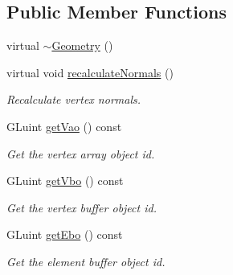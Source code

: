 \subsection*{Public Member Functions}
\begin{DoxyCompactItemize}
\item 
virtual \mbox{\hyperlink{classec_1_1_geometry_a964c581313da2be51a3c78d3be7f48b3}{$\sim$\+Geometry}} ()
\item 
virtual void \mbox{\hyperlink{classec_1_1_geometry_a228d4a0fa01a17379f24aee2c769b501}{recalculate\+Normals}} ()
\begin{DoxyCompactList}\small\item\em Recalculate vertex normals. \end{DoxyCompactList}\item 
G\+Luint \mbox{\hyperlink{classec_1_1_geometry_a91a89baad39d4f2b2c4e9774d952dce9}{get\+Vao}} () const
\begin{DoxyCompactList}\small\item\em Get the vertex array object id. \end{DoxyCompactList}\item 
G\+Luint \mbox{\hyperlink{classec_1_1_geometry_abad5d4311d16462099b8f9d084d99dd4}{get\+Vbo}} () const
\begin{DoxyCompactList}\small\item\em Get the vertex buffer object id. \end{DoxyCompactList}\item 
G\+Luint \mbox{\hyperlink{classec_1_1_geometry_a5d956ff01a7b6648ede8982e0a461ae0}{get\+Ebo}} () const
\begin{DoxyCompactList}\small\item\em Get the element buffer object id. \end{DoxyCompactList}\end{DoxyCompactItemize}
